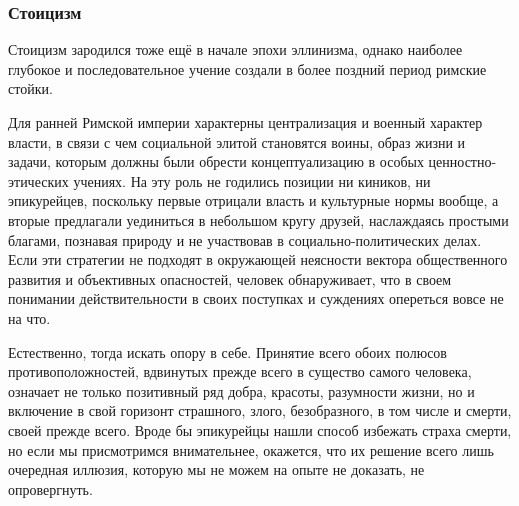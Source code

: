 
\subsubsection{Стоицизм}

Стоицизм зародился тоже ещё в начале эпохи эллинизма, однако наиболее глубокое и
последовательное учение создали в более поздний период римские стойки.

Для
ранней Римской империи характерны централизация и военный характер власти, в
связи с чем социальной элитой становятся воины, образ жизни и задачи, которым
должны были обрести концептуализацию в особых ценностно-этических учениях. 
На эту роль не годились позиции ни киников, ни эпикурейцев,
поскольку первые отрицали власть и культурные нормы вообще, а вторые предлагали
уединиться в небольшом кругу друзей, наслаждаясь простыми благами, познавая
природу и не участвовав в социально-политических делах. Если эти стратегии не
подходят в окружающей неясности вектора общественного развития и объективных
опасностей, человек обнаруживает, что в своем понимании действительности в своих
поступках и суждениях опереться вовсе не на что. 

Естественно, тогда искать опору
в себе. Принятие всего обоих полюсов противоположностей, вдвинутых прежде
всего в существо самого человека, означает не только позитивный ряд добра,
красоты, разумности жизни, но и включение в свой горизонт страшного, злого,
безобразного, в том числе и смерти, своей прежде всего. Вроде бы эпикурейцы
нашли способ избежать страха смерти, но если мы присмотримся внимательнее,
окажется, что их решение всего лишь очередная иллюзия, которую мы не можем на
опыте не доказать, не опровергнуть. 

